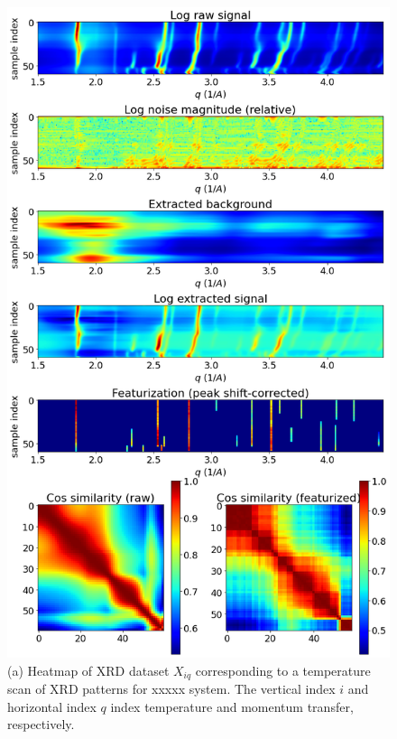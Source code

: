 \documentclass[12pt]{iopart}
\begin{document}
\begin{figure}
  \includegraphics[scale=.5]{paper_figures/pkg/2_T_summary.png}
  \caption{ (a) Heatmap of XRD dataset $X_{iq}$ corresponding to a temperature scan
of XRD patterns for xxxxx system. The vertical index $i$ and horizontal
index $q$ index temperature and momentum transfer, respectively. }
  \label{fig:heatmaps}
\end{figure}
%
%
\end{document}
